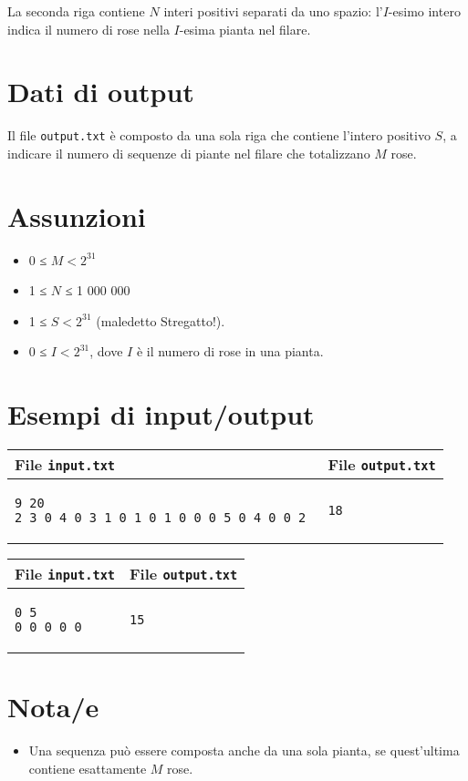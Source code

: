 \documentclass[a4paper,11pt]{article}
\begin{document}
La seconda riga contiene $N$ interi positivi separati da uno
spazio: l'$I$-esimo intero indica il numero di rose
nella  $I$-esima pianta nel filare.


\section*{Dati di output}
  
Il file \texttt{output.txt} è composto da una sola riga che
contiene l'intero positivo $S$, a indicare il numero di
sequenze di piante nel filare che totalizzano $M$ rose.

  \section*{Assunzioni}
  \begin{itemize}
  
    \item  0 ≤ $M < 2^{31}$
    \item  1 ≤ $N$ ≤ 1 000 000
    \item  1 ≤ $S < 2^{31}$ (maledetto Stregatto!).
    \item  0 ≤ $I < 2^{31}$,
  dove $I$ è il numero di rose in una pianta.
  \end{itemize}

\section*{Esempi di input/output}

  
    \noindent
    \begin{tabular}{p{11cm}|p{5cm}}
    \toprule
    \textbf{File \texttt{input.txt}}
    & \textbf{File \texttt{output.txt}}
    \\
    \midrule
    \scriptsize
    \begin{verbatim}
9 20
2 3 0 4 0 3 1 0 1 0 1 0 0 0 5 0 4 0 0 2 
\end{verbatim}
    &
    \scriptsize
    \begin{verbatim}
18
\end{verbatim}
    \\
    \bottomrule
    \end{tabular}
  
    \noindent
    \begin{tabular}{p{11cm}|p{5cm}}
    \toprule
    \textbf{File \texttt{input.txt}}
    & \textbf{File \texttt{output.txt}}
    \\
    \midrule
    \scriptsize
    \begin{verbatim}
0 5
0 0 0 0 0
\end{verbatim}
    &
    \scriptsize
    \begin{verbatim}
15
\end{verbatim}
    \\
    \bottomrule
    \end{tabular}
  
\section*{Nota/e}
\begin{itemize}
  
    \item  
Una sequenza può essere composta anche da una sola pianta, se
quest'ultima contiene esattamente $M$ rose.

\end{itemize}
\end{document}
